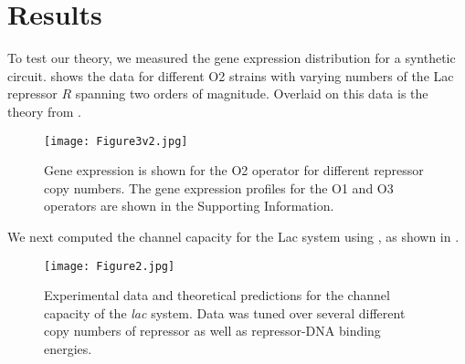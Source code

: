 \pagebreak
\section{Results}

To test our theory, we measured the gene expression distribution for a synthetic
circuit. \fref[figFullProfile] shows the data for different O2 strains with
varying numbers of the Lac repressor $R$ spanning two orders of magnitude.
Overlaid on this data is the theory from
\eref[eqGeneExpressionDistributionFastRates].

\begin{figure}[h!]
	\centering \texttt{[image: Figure3v2.jpg]} 
	\caption{ Gene expression is shown for the O2 operator for different repressor copy numbers. The gene expression profiles for the O1 and O3 operators are shown in the Supporting Information.}
	\label{figFullProfile}
\end{figure}

We next computed the channel capacity for the Lac system using
\eref[eqChannelCapacity], as shown in \fref[figChannelCapacity].

\begin{figure}[h!]
	\centering \texttt{[image: Figure2.jpg]} 
	\caption{ Experimental data and theoretical predictions for the channel capacity of the \textit{lac} system. Data was tuned over several different copy numbers of repressor as well as repressor-DNA binding energies.}
	\label{figChannelCapacity}
\end{figure}